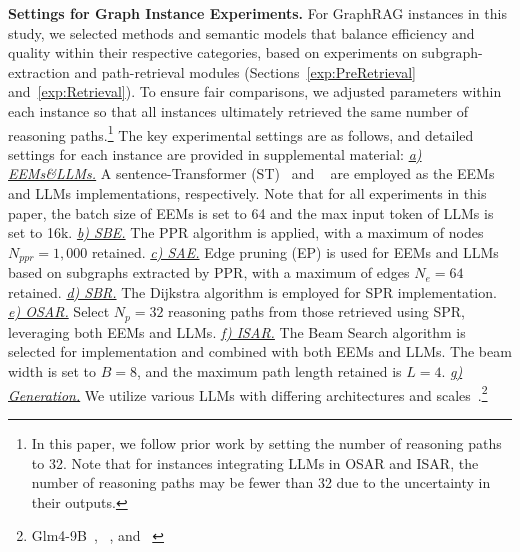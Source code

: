 \textbf{Settings for Graph Instance Experiments.} For GraphRAG instances in this study, we selected methods and semantic models that balance efficiency and quality within their respective categories, based on experiments on subgraph-extraction and path-retrieval modules (Sections~\ref{exp:PreRetrieval} and~\ref{exp:Retrieval}).
To ensure fair comparisons, we adjusted parameters within each instance so that all instances ultimately retrieved the same number of reasoning paths.\footnote{In this paper, we follow prior work {\cite{RoG,GNN-RAG,LessIsMore}} by setting the number of reasoning paths to 32. Note that for instances integrating LLMs in OSAR and ISAR, the number of reasoning paths may be fewer than 32 due to the uncertainty in their outputs.} The key experimental settings are as follows, and detailed settings for each instance are provided in supplemental material:
{\it \underline{a) EEMs\&LLMs.}} A sentence-Transformer (ST)~\cite{MiniLM} and {}~\cite{qwen2} are employed as the EEMs and LLMs implementations, respectively. Note that for all experiments in this paper, the batch size of EEMs is set to 64 and the max input token of LLMs is set to 16k.
{\it \underline{b) SBE.}} The PPR algorithm is applied, with a maximum of nodes $N_{ppr}=1,000$ retained.
{\it \underline{c) SAE.}} Edge pruning (EP) is used for EEMs and LLMs based on subgraphs extracted by PPR, with a maximum of edges $N_{e}=64$ retained.
{\it \underline{d) SBR.}} The Dijkstra algorithm is employed for SPR implementation.
{\it \underline{e) OSAR.}} Select $N_p=32$ reasoning paths from those retrieved using SPR, leveraging both EEMs and LLMs.
{\it \underline{f) ISAR.}} The Beam Search algorithm is selected for implementation and combined with both EEMs and LLMs. The beam width is set to $B=8$, and the maximum path length retained is $L=4$.
{\it \underline{g) Generation.}} We utilize various LLMs with differing architectures and scales~.\footnote{Glm4-9B~\cite{glm2024chatglm}, ~\cite{llama3},  and ~\cite{qwen2}}



